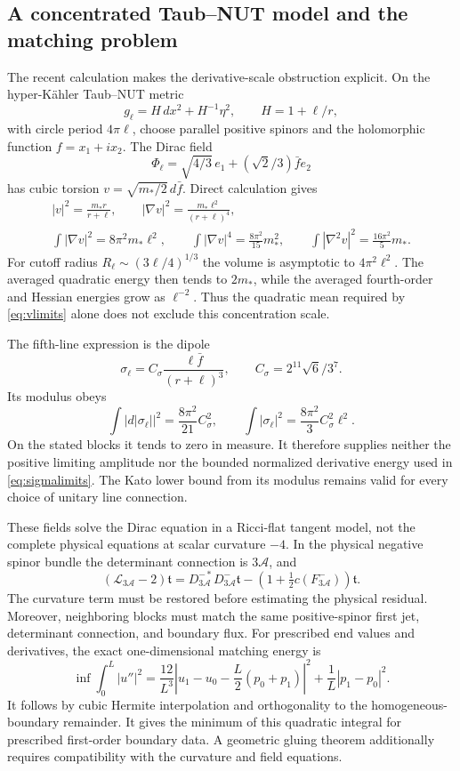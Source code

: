 \documentclass[11pt,a4paper]{article}
\theoremstyle{definition}
\theoremstyle{remark}
\newcommand{\Acal}{\mathcal A}
\begin{document}
\subsection*{A concentrated Taub--NUT model and the matching problem}
The recent calculation \cite{TaubNUT} makes the derivative-scale obstruction explicit. On the hyper-K\"ahler Taub--NUT metric
\[
 g_\ell=H\,dx^2+H^{-1}\eta^2,\qquad H=1+\ell/r,
\]
with circle period $4\pi\ell$, choose parallel positive spinors and the holomorphic function $f=x_1+ix_2$. The Dirac field
\[
 \Phi_\ell=\sqrt{4/3}\,e_1+(\sqrt2/3)\bar f e_2
\]
has cubic torsion $v=\sqrt{m_*/2}\,d\bar f$. Direct calculation gives
\begin{gather*}
 |v|^2=\frac{m_*r}{r+\ell},\qquad
 |\nabla v|^2=\frac{m_*\ell^2}{(r+\ell)^4},\\
 \int|\nabla v|^2=8\pi^2m_*\ell^2,\qquad
 \int|\nabla v|^4=\frac{8\pi^2}{15}m_*^2,\qquad
 \int|\nabla^2v|^2=\frac{16\pi^2}{5}m_*.
\end{gather*}
For cutoff radius $R_\ell\sim(3\ell/4)^{1/3}$ the volume is asymptotic to $4\pi^2\ell^2$. The averaged quadratic energy then tends to $2m_*$, while the averaged fourth-order and Hessian energies grow as $\ell^{-2}$. Thus the quadratic mean required by \eqref{eq:vlimits} alone does not exclude this concentration scale.

The fifth-line expression is the dipole
\[
 \sigma_\ell=C_\sigma\frac{\ell\bar f}{(r+\ell)^3},\qquad
 C_\sigma=2^{11}\sqrt6/3^7.
\]
Its modulus obeys
\[
 \int|d|\sigma_\ell||^2=\frac{8\pi^2}{21}C_\sigma^2,
 \qquad\int|\sigma_\ell|^2=\frac{8\pi^2}{3}C_\sigma^2\ell^2.
\]
On the stated blocks it tends to zero in measure. It therefore supplies neither the positive limiting amplitude nor the bounded normalized derivative energy used in \eqref{eq:sigmalimits}. The Kato lower bound from its modulus remains valid for every choice of unitary line connection.

These fields solve the Dirac equation in a Ricci-flat tangent model, not the complete physical equations at scalar curvature $-4$. In the physical negative spinor bundle the determinant connection is $3\Acal$, and
\[
 (\mathscr L_{3\Acal}-2)\mathfrak t
 =D_{3\Acal}^{-*}D_{3\Acal}^-\mathfrak t
 -\left(1+\tfrac12c(F^-_{3\Acal})\right)\mathfrak t.
\]
The curvature term must be restored before estimating the physical residual. Moreover, neighboring blocks must match the same positive-spinor first jet, determinant connection, and boundary flux. For prescribed end values and derivatives, the exact one-dimensional matching energy is
\[
 \inf\int_0^L|u''|^2
 =\frac{12}{L^3}\left|u_1-u_0-\frac L2(p_0+p_1)\right|^2
 +\frac1L|p_1-p_0|^2.
\]
It follows by cubic Hermite interpolation and orthogonality to the homogeneous-boundary remainder. It gives the minimum of this quadratic integral for prescribed first-order boundary data. A geometric gluing theorem additionally requires compatibility with the curvature and field equations.
\end{document}
